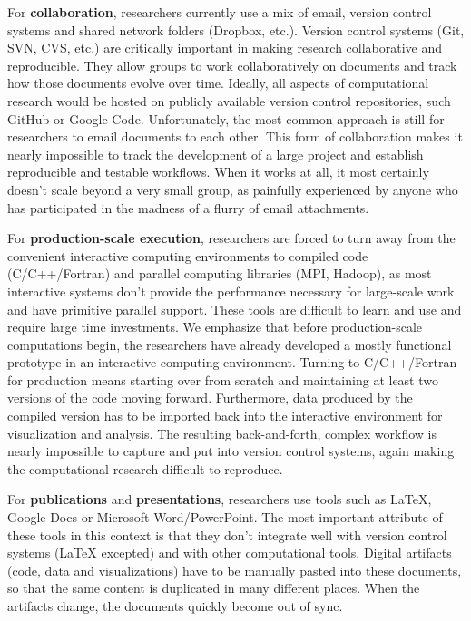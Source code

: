 \documentclass[ChapterTOCs,krantz2]{krantz} %
\begin{document}
For \textbf{collaboration}, researchers currently use a mix of email,
version control systems and shared network folders (Dropbox, etc.).
Version control systems (Git, SVN, CVS, etc.) are critically important
in making research collaborative and reproducible. They allow groups
to work collaboratively on documents and track how those documents
evolve over time. Ideally, all aspects of computational research would
be hosted on publicly available version control repositories, such
GitHub or Google Code. Unfortunately, the most common approach is
still for researchers to email documents to each other. This form
of collaboration makes it nearly impossible to track the development
of a large project and establish reproducible and testable workflows.
When it works at all, it most certainly doesn't scale beyond a very
small group, as painfully experienced by anyone who has participated
in the madness of a flurry of email attachments. 

For \textbf{production-scale execution}, researchers are forced to
turn away from the convenient interactive computing environments to
compiled code (C/C++/Fortran) and parallel computing libraries (MPI,
Hadoop), as most interactive systems don't provide the performance
necessary for large-scale work and have primitive parallel support.
These tools are difficult to learn and use and require large time
investments. We emphasize that before production-scale computations
begin, the researchers have already developed a mostly functional
prototype in an interactive computing environment. Turning to C/C++/Fortran
for production means starting over from scratch and maintaining at
least two versions of the code moving forward. Furthermore, data produced
by the compiled version has to be imported back into the interactive
environment for visualization and analysis. The resulting back-and-forth,
complex workflow is nearly impossible to capture and put into version
control systems, again making the computational research difficult
to reproduce.

For \textbf{publications} and\textbf{ presentations}, researchers
use tools such as \LaTeX{}, Google Docs or Microsoft Word/PowerPoint.
The most important attribute of these tools in this context is that
they don't integrate well with version control systems (\LaTeX{} excepted)
and with other computational tools. Digital artifacts (code, data
and visualizations) have to be manually pasted into these documents,
so that the same content is duplicated in many different places. When
the artifacts change, the documents quickly become out of sync. 
\end{document}
